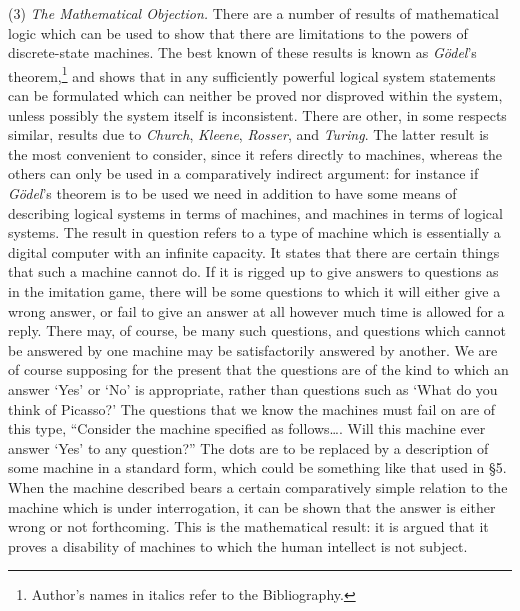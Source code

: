 \documentclass[10pt]{article} %
\begin{document}
\noindent\normalfont (3) \textit{The Mathematical Objection.} There are a number of results of mathematical logic which can be used to show that there are limitations to the powers of discrete-state machines. The best known of these results is known as \textit{Gödel}'s theorem,\footnote{\normalfont\tiny Author's names in italics refer to the Bibliography.} and shows that in any sufficiently powerful logical system statements can be formulated which can neither be proved nor disproved within the system, unless possibly the system itself is inconsistent. There are other, in some respects similar, results due to \textit{Church}, \textit{Kleene}, \textit{Rosser}, and \textit{Turing}. The latter result is the most convenient to consider, since it refers directly to machines, whereas the others can only be used in a comparatively indirect argument: for instance if \textit{Gödel}'s theorem is to be used we need in addition to have some means of describing logical systems in terms of machines, and machines in terms of logical systems. The result in question refers to a type of machine which is essentially a digital computer with an infinite capacity. It states that there are certain things that such a machine cannot do. If it is rigged up to give answers to questions as in the imitation game, there will be some questions to which it will either give a wrong answer, or fail to give an answer at all however much time is allowed for a reply. There may, of course, be many such questions, and questions which cannot be answered by one machine may be satisfactorily answered by another. We are of course supposing for the present that the questions are of the kind to which an answer `Yes' or `No' is appropriate, rather than questions such as `What do you think of Picasso?' The questions that we know the machines must fail on are of this type, ``Consider the machine specified as follows\dots{}. Will this machine ever answer `Yes' to any question?'' The dots are to be replaced by a description of some machine in a standard form, which could be something like that used in \S 5. When the machine described bears a certain comparatively simple relation to the machine which is under interrogation, it can be shown that the answer is either wrong or not forthcoming. This is the mathematical result: it is argued that it proves a disability of machines to which the human intellect is not subject.
\end{document}
